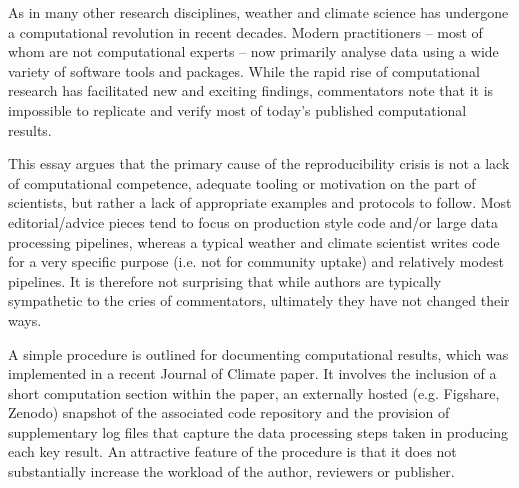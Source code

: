 As in many other research disciplines, weather and climate science has undergone a computational revolution in recent decades. Modern practitioners – most of whom are not computational experts – now primarily analyse data using a wide variety of software tools and packages. While the rapid rise of computational research has facilitated new and exciting findings, commentators note that it is impossible to replicate and verify most of today's published computational results.

This essay argues that the primary cause of the reproducibility crisis is not a lack of computational competence, adequate tooling or motivation on the part of scientists, but rather a lack of appropriate examples and protocols to follow. Most editorial/advice pieces tend to focus on production style code and/or large data processing pipelines, whereas a typical weather and climate scientist writes code for a very specific purpose (i.e. not for community uptake) and relatively modest pipelines. It is therefore not surprising that while authors are typically sympathetic to the cries of commentators, ultimately they have not changed their ways.

A simple procedure is outlined for documenting computational results, which was implemented in a recent Journal of Climate paper. It involves the inclusion of a short computation section within the paper, an externally hosted (e.g. Figshare, Zenodo) snapshot of the associated code repository and the provision of supplementary log files that capture the data processing steps taken in producing each key result. An attractive feature of the procedure is that it does not substantially increase the workload of the author, reviewers or publisher.
